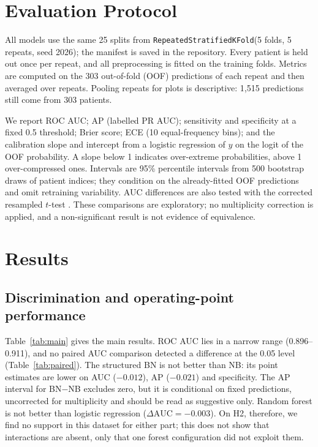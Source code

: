 \documentclass[conference]{IEEEtran}
\begin{document}
\section{Evaluation Protocol}
All models use the same 25 splits from \texttt{RepeatedStratifiedKFold}(5 folds, 5 repeats, seed 2026); the manifest is saved in the repository. Every patient is held out once per repeat, and all preprocessing is fitted on the training folds. Metrics are computed on the 303 out-of-fold (OOF) predictions of each repeat and then averaged over repeats. Pooling repeats for plots is descriptive: 1,515 predictions still come from 303 patients.

We report ROC AUC; AP (labelled PR AUC); sensitivity and specificity at a fixed 0.5 threshold; Brier score; ECE (10 equal-frequency bins); and the calibration slope and intercept from a logistic regression of $y$ on the logit of the OOF probability. A slope below 1 indicates over-extreme probabilities, above 1 over-compressed ones. Intervals are 95\% percentile intervals from 500 bootstrap draws of patient indices; they condition on the already-fitted OOF predictions and omit retraining variability. AUC differences are also tested with the corrected resampled $t$-test \cite{nadeau2003}. These comparisons are exploratory; no multiplicity correction is applied, and a non-significant result is not evidence of equivalence.

\section{Results}
\subsection{Discrimination and operating-point performance}
Table~\ref{tab:main} gives the main results. ROC AUC lies in a narrow range (0.896--0.911), and no paired AUC comparison detected a difference at the 0.05 level (Table~\ref{tab:paired}). The structured BN is not better than NB: its point estimates are lower on AUC ($-0.012$), AP ($-0.021$) and specificity. The AP interval for BN$-$NB excludes zero, but it is conditional on fixed predictions, uncorrected for multiplicity and should be read as suggestive only. Random forest is not better than logistic regression ($\Delta\mathrm{AUC}=-0.003$). On H2, therefore, we find no support in this dataset for either part; this does not show that interactions are absent, only that one forest configuration did not exploit them.
\end{document}
